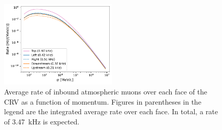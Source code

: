 \begin{figure}
    \centering
    \includegraphics[width=0.5\textwidth]{chapter5/rate_vs_p.pdf}
    \caption{
        Average rate of inbound atmospheric muons over each face of the CRV as a
        function of momentum. Figures in parentheses in the legend are the
        integrated average rate over each face. In total, a rate of
        \SI{3.47}{\kHz} is expected.
    }
    \label{fig:avg_rate_per_face}
\end{figure}